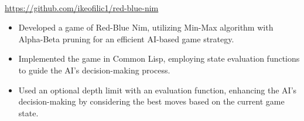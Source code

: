 \\
{\url{https://github.com/ikeofilic1/red-blue-nim}}
\begin{itemize}
    \item Developed a game of Red-Blue Nim, utilizing Min-Max algorithm with Alpha-Beta pruning for an efficient AI-based game strategy.
    \item Implemented the game in Common Lisp, employing state evaluation functions to guide the AI's decision-making process.
    \item Used an optional depth limit with an evaluation function, enhancing the AI's decision-making by considering the best moves based on the current game state.
\end{itemize}
